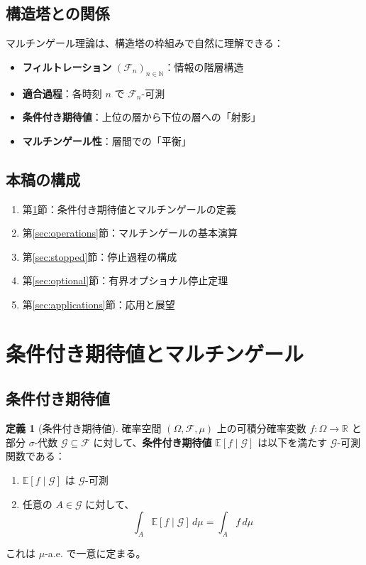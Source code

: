 \documentclass[12pt,a4paper]{article}
\theoremstyle{definition}
\newtheorem{definition}{定義}[section]
\newcommand{\N}{\mathbb{N}}
\newcommand{\R}{\mathbb{R}}
\newcommand{\E}{\mathbb{E}}
\newcommand{\cF}{\mathcal{F}}
\begin{document}
\subsection{構造塔との関係}

マルチンゲール理論は、構造塔の枠組みで自然に理解できる：

\begin{itemize}
\item \textbf{フィルトレーション} $(\cF_n)_{n \in \N}$：情報の階層構造
\item \textbf{適合過程}：各時刻 $n$ で $\cF_n$-可測
\item \textbf{条件付き期待値}：上位の層から下位の層への「射影」
\item \textbf{マルチンゲール性}：層間での「平衡」
\end{itemize}

\subsection{本稿の構成}

\begin{enumerate}
\item 第\ref{sec:basic}節：条件付き期待値とマルチンゲールの定義
\item 第\ref{sec:operations}節：マルチンゲールの基本演算
\item 第\ref{sec:stopped}節：停止過程の構成
\item 第\ref{sec:optional}節：有界オプショナル停止定理
\item 第\ref{sec:applications}節：応用と展望
\end{enumerate}

\section{条件付き期待値とマルチンゲール}\label{sec:basic}

\subsection{条件付き期待値}

\begin{definition}[条件付き期待値]
確率空間 $(\Omega, \cF, \mu)$ 上の可積分確率変数 $f : \Omega \to \R$ と部分 $\sigma$-代数 $\mathcal{G} \subseteq \cF$ に対して、\textbf{条件付き期待値} $\E[f \mid \mathcal{G}]$ は以下を満たす $\mathcal{G}$-可測関数である：
\begin{enumerate}
\item $\E[f \mid \mathcal{G}]$ は $\mathcal{G}$-可測
\item 任意の $A \in \mathcal{G}$ に対して、
\[
\int_A \E[f \mid \mathcal{G}] \, d\mu = \int_A f \, d\mu
\]
\end{enumerate}
これは $\mu$-a.e. で一意に定まる。
\end{definition}
\end{document}

